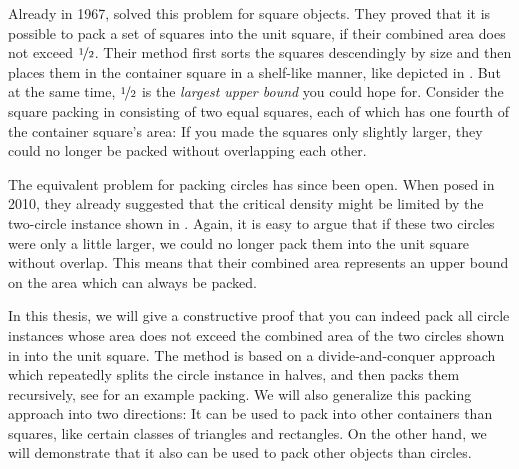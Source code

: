 \documentclass[a4paper,style=print,bibliography=totoc,nexus,lnum,extramargin]{tubsbook}
\begin{document}
Already in 1967, \textcite{MM1967some} solved this problem for square objects. They proved that it is possible to pack a set of squares into the unit square, if their combined area does not exceed $\nicefrac{1}{2}$. Their method first sorts the squares descendingly by size and then places them in the container square in a shelf-like manner, like depicted in . But at the same time, $\nicefrac{1}{2}$ is the \emph{largest upper bound} you could hope for. Consider the square packing in  consisting of two equal squares, each of which has one fourth of the container square's area: If you made the squares only slightly larger, they could no longer be packed without overlapping each other.



The equivalent problem for packing circles has since been open.
When \textcite{DFL2010circle} posed  in 2010, they already suggested that the critical density might be limited by the two-circle instance shown in . Again, it is easy to argue that if these two circles were only a little larger, we could no longer pack them into the unit square without overlap. This means that their combined area represents an upper bound on the area which can always be packed.


In this thesis, we will give a constructive proof that you can indeed pack all circle instances whose area does not exceed the combined area of the two circles shown in  into the unit square.
The method is based on a divide-and-conquer approach which repeatedly splits the circle instance in halves, and then packs them recursively,
see  for an example packing.
We will also generalize this packing approach into two directions: It can be used to pack into other containers than squares, like certain classes of triangles and rectangles. On the other hand, we will demonstrate that it also can be used to pack other objects than circles.
\end{document}
